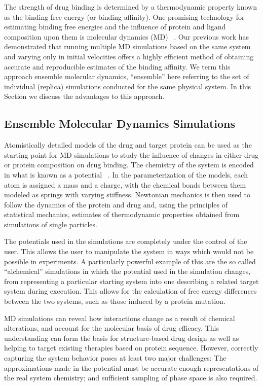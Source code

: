 \cite{Wan2017brd4}

The strength of drug binding is determined by a thermodynamic property known
as the binding free energy (or binding affinity). 
One promising technology for estimating binding free energies and the influence 
of protein and ligand composition upon them is molecular dynamics (MD)
~\cite{Karplus2005}. 
Our previous work \cite{Sadiq2010, Wan2011} has demonstrated that running multiple 
MD simulations based on the same system and varying only in initial velocities
offers a highly efficient method of obtaining accurate and reproducible
estimates of the binding affinity. 
We term this approach ensemble molecular dynamics, ``ensemble'' here referring to 
the set of individual (replica) simulations conducted for the same physical system. 
In this Section we discuss the advantages to this approach.

\subsection{Ensemble Molecular Dynamics Simulations}

Atomistically detailed models of the drug and target protein can be used as the
starting point for MD simulations to study the influence of changes in 
either drug or protein composition on drug binding. 
The chemistry of the system is encoded in what is known as a potential
~\cite{Karplus2002}. 
In the parameterization of the models, each atom is assigned a mass and a charge,
with the chemical bonds between them modeled as springs with varying
stiffness.
Newtonian mechanics is then used to follow the dynamics of the protein and drug and, 
using the principles of statistical mechanics, estimates of thermodynamic properties 
obtained from simulations of single particles.

The potentials used in the simulations are completely under the control of
the user. 
This allows the user to manipulate the system in ways which would
not be possible in experiments. 
A particularly powerful example of this are
the so called ``alchemical'' simulations in which the potential used in the
simulation changes, from representing a particular starting system into one 
describing a related target system during execution. 
This allows for the calculation of free energy differences between the two 
systems, such as those induced by a protein mutation.

MD simulations can reveal how interactions change as a result of chemical alterations,
and account for the molecular basis of drug efficacy. 
This understanding can form the basis for structure-based drug design as well as helping 
to target existing therapies based on protein sequence. 
However, correctly capturing the system behavior poses at least two major 
challenges: The approximations made in the potential must be accurate enough representations 
of the real system chemistry; and sufficient sampling of phase space is also required.


